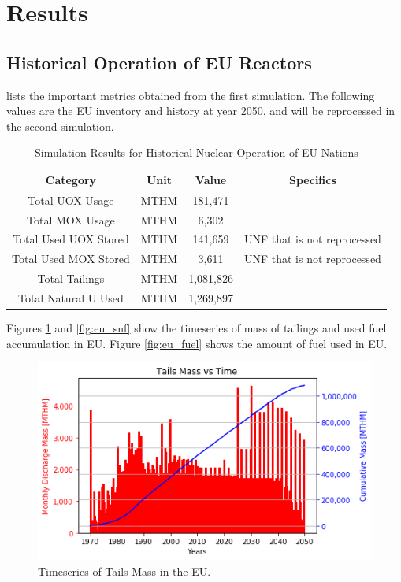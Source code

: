 \section{Results}

\subsection{Historical Operation of \gls{EU} Reactors}

 lists the important metrics
obtained from the first simulation. The following
values are the \gls{EU} inventory and history at year 2050,
and will be reprocessed in the second simulation.

\begin{table}[h]
	\centering
		\begin{tabular}{|c|c|c|c|}
			\hline
			Category & Unit & Value & Specifics\\ \hline
			Total UOX Usage & MTHM & 181,471 &  \\ \hline
			Total MOX Usage & MTHM & 6,302 & \\ \hline
			Total Used UOX Stored & MTHM & 141,659 & \gls{UNF} that is not reprocessed\\ \hline
			Total Used  MOX Stored & MTHM & 3,611 & \gls{UNF} that is not reprocessed \\ \hline
			Total Tailings & MTHM & 1,081,826 & \\ \hline
			Total Natural U Used & MTHM & 1,269,897 & \\ \hline
		\end{tabular}
		\caption{Simulation Results for Historical Nuclear Operation of \gls{EU} Nations}
		\label{tab:sim_result}
\end {table}
\FloatBarrier


Figures \ref{fig:eu_tail} and \ref{fig:eu_snf} show the 
timeseries of mass of tailings and used fuel accumulation in \gls{EU}.
Figure \ref{fig:eu_fuel} shows the amount of fuel used in \gls{EU}.


\begin{figure}[htbp!]
	\begin{center}
		\includegraphics[scale=0.7]{./images/eu_future/tails.png}
	\end{center}
	\caption{Timeseries of Tails Mass in the \gls{EU}.}
	\label{fig:eu_tail}
\end{figure}

